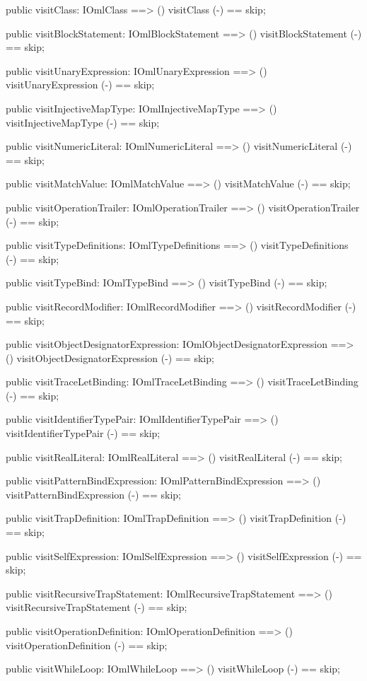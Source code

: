 \begin{vdm_al}
  public visitClass: IOmlClass ==> ()
  visitClass (-) == skip;

  public visitBlockStatement: IOmlBlockStatement ==> ()
  visitBlockStatement (-) == skip;

  public visitUnaryExpression: IOmlUnaryExpression ==> ()
  visitUnaryExpression (-) == skip;

  public visitInjectiveMapType: IOmlInjectiveMapType ==> ()
  visitInjectiveMapType (-) == skip;

  public visitNumericLiteral: IOmlNumericLiteral ==> ()
  visitNumericLiteral (-) == skip;

  public visitMatchValue: IOmlMatchValue ==> ()
  visitMatchValue (-) == skip;

  public visitOperationTrailer: IOmlOperationTrailer ==> ()
  visitOperationTrailer (-) == skip;

  public visitTypeDefinitions: IOmlTypeDefinitions ==> ()
  visitTypeDefinitions (-) == skip;

  public visitTypeBind: IOmlTypeBind ==> ()
  visitTypeBind (-) == skip;

  public visitRecordModifier: IOmlRecordModifier ==> ()
  visitRecordModifier (-) == skip;

  public visitObjectDesignatorExpression: IOmlObjectDesignatorExpression ==> ()
  visitObjectDesignatorExpression (-) == skip;

  public visitTraceLetBinding: IOmlTraceLetBinding ==> ()
  visitTraceLetBinding (-) == skip;

  public visitIdentifierTypePair: IOmlIdentifierTypePair ==> ()
  visitIdentifierTypePair (-) == skip;

  public visitRealLiteral: IOmlRealLiteral ==> ()
  visitRealLiteral (-) == skip;

  public visitPatternBindExpression: IOmlPatternBindExpression ==> ()
  visitPatternBindExpression (-) == skip;

  public visitTrapDefinition: IOmlTrapDefinition ==> ()
  visitTrapDefinition (-) == skip;

  public visitSelfExpression: IOmlSelfExpression ==> ()
  visitSelfExpression (-) == skip;

  public visitRecursiveTrapStatement: IOmlRecursiveTrapStatement ==> ()
  visitRecursiveTrapStatement (-) == skip;

  public visitOperationDefinition: IOmlOperationDefinition ==> ()
  visitOperationDefinition (-) == skip;

  public visitWhileLoop: IOmlWhileLoop ==> ()
  visitWhileLoop (-) == skip;


\end{vdm_al}
